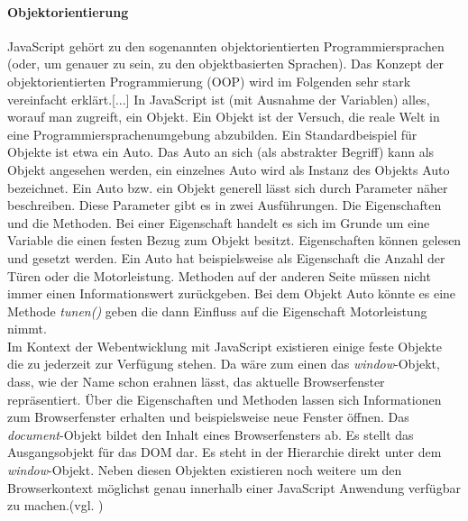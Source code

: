\documentclass[12pt,a4paper,bibliography=totocnumbered,listof=totocnumbered]{scrartcl}
\begin{document}
\paragraph{Objektorientierung} \glqq JavaScript gehört zu den sogenannten objektorientierten Programmiersprachen (oder, um genauer zu sein, zu den objektbasierten Sprachen). Das Konzept der objektorientierten Programmierung (OOP) wird im Folgenden sehr stark vereinfacht erklärt.[...] In JavaScript ist (mit Ausnahme der Variablen) alles, worauf man zugreift, ein Objekt. Ein Objekt ist der Versuch, die reale Welt in eine Programmiersprachenumgebung abzubilden. Ein Standardbeispiel für Objekte ist etwa ein Auto. Das Auto an sich (als abstrakter Begriff) kann als Objekt angesehen werden, ein einzelnes Auto wird als Instanz des Objekts Auto bezeichnet.\grqq{}\cite[S.93]{WenzJava2008} Ein Auto bzw. ein Objekt generell lässt sich durch Parameter näher beschreiben. Diese Parameter gibt es in zwei Ausführungen. Die Eigenschaften und die Methoden. Bei einer Eigenschaft handelt es sich im Grunde um eine Variable die einen festen Bezug zum Objekt besitzt. Eigenschaften können gelesen und gesetzt werden. Ein Auto hat beispielsweise als Eigenschaft die Anzahl der Türen oder die Motorleistung. Methoden auf der anderen Seite müssen nicht immer einen Informationswert zurückgeben. Bei dem Objekt Auto könnte es eine Methode \textit{tunen()} geben die dann Einfluss auf die Eigenschaft Motorleistung nimmt.\\Im Kontext der Webentwicklung mit JavaScript existieren einige feste Objekte die zu jederzeit zur Verfügung stehen. Da wäre zum einen das \textit{window}-Objekt, dass, wie der Name schon erahnen lässt, das aktuelle Browserfenster repräsentiert. Über die Eigenschaften und Methoden lassen sich Informationen zum Browserfenster erhalten und beispielsweise neue Fenster öffnen. Das \textit{document}-Objekt bildet den Inhalt eines Browserfensters ab. Es stellt das Ausgangsobjekt für das DOM dar. Es steht in der Hierarchie direkt unter dem \textit{window}-Objekt. Neben diesen Objekten existieren noch weitere um den Browserkontext möglichst genau innerhalb einer JavaScript Anwendung verfügbar zu machen.(vgl. \cite{SelfHtml20147})
\end{document}
